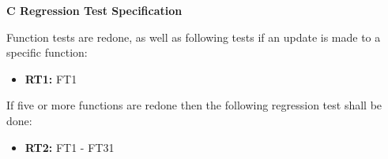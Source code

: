 \documentclass{article}
\begin{document}
		\newpage
		\begin{flushleft}
		{\large \textbf{C Regression Test Specification}}
		\end{flushleft}
			
		\begin{flushleft}
		Function tests are redone, as well as following tests if an update is made to a specific function:
		\end{flushleft}
		
		\begin{itemize}
		
  			\item \textbf{RT1:} FT1
  			
			  					
		\end{itemize}
		
		\begin{flushleft}
			If five or more functions are redone then the following regression test shall be done:
			\end{flushleft}	
		
		\begin{itemize}			
  			
  			\item \textbf{RT2:} FT1 - FT31		

		\end{itemize}
		
		
			
		


\end{document}
